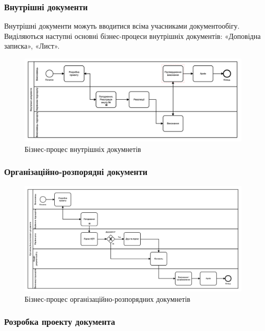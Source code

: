 \subsubsection{Внутрішні документи}

Внутрішні документи можуть вводитися всіма учасниками документообігу.
Виділяються наступні основні бізнес-процеси внутрішніх
документів: «Доповідна записка», «Лист».

\begin{figure}[!htbp]
\centerline{\includegraphics[scale=0.27]{internalDoc.png}}
\caption{Бізнес-процес внутрішніх докумнетів}
\end{figure}

\subsubsection{Організаційно-розпорядні документи}

\begin{figure}[!htbp]
\centerline{\includegraphics[scale=0.25]{orgDoc.png}}
\caption{Бізнес-процес організаційно-розпорядних докумнетів}
\end{figure}

\subsubsection*{Розробка проекту документа}

